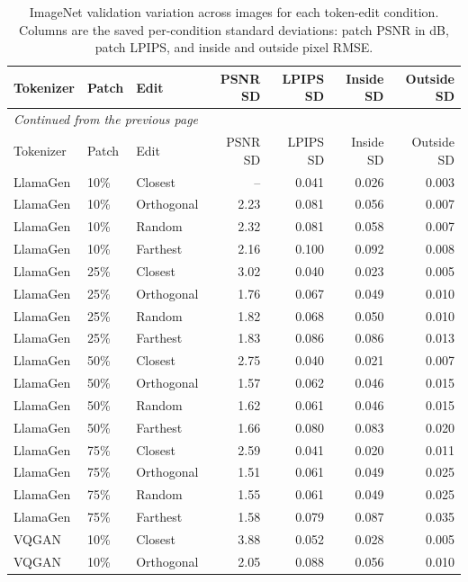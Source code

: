 \begingroup
\small
\setlength{\tabcolsep}{4pt}
\begin{longtable}{lllrrrr}
\caption[ImageNet validation variation across images for each token-edit condition]{ImageNet validation variation across images for each token-edit condition. Columns are the saved per-condition standard deviations: patch PSNR in dB, patch LPIPS, and inside and outside pixel RMSE.}\label{tab:app_imagenet_val_variability}\\
\hline
Tokenizer & Patch & Edit & PSNR SD & LPIPS SD & Inside SD & Outside SD \\ \hline
\endfirsthead
\multicolumn{7}{l}{\small\itshape Continued from the previous page}\\
\hline
Tokenizer & Patch & Edit & PSNR SD & LPIPS SD & Inside SD & Outside SD \\ \hline
\endhead
\hline
\endfoot
LlamaGen & 10\% & Closest & -- & 0.041 & 0.026 & 0.003 \\
LlamaGen & 10\% & Orthogonal & 2.23 & 0.081 & 0.056 & 0.007 \\
LlamaGen & 10\% & Random & 2.32 & 0.081 & 0.058 & 0.007 \\
LlamaGen & 10\% & Farthest & 2.16 & 0.100 & 0.092 & 0.008 \\
LlamaGen & 25\% & Closest & 3.02 & 0.040 & 0.023 & 0.005 \\
LlamaGen & 25\% & Orthogonal & 1.76 & 0.067 & 0.049 & 0.010 \\
LlamaGen & 25\% & Random & 1.82 & 0.068 & 0.050 & 0.010 \\
LlamaGen & 25\% & Farthest & 1.83 & 0.086 & 0.086 & 0.013 \\
LlamaGen & 50\% & Closest & 2.75 & 0.040 & 0.021 & 0.007 \\
LlamaGen & 50\% & Orthogonal & 1.57 & 0.062 & 0.046 & 0.015 \\
LlamaGen & 50\% & Random & 1.62 & 0.061 & 0.046 & 0.015 \\
LlamaGen & 50\% & Farthest & 1.66 & 0.080 & 0.083 & 0.020 \\
LlamaGen & 75\% & Closest & 2.59 & 0.041 & 0.020 & 0.011 \\
LlamaGen & 75\% & Orthogonal & 1.51 & 0.061 & 0.049 & 0.025 \\
LlamaGen & 75\% & Random & 1.55 & 0.061 & 0.049 & 0.025 \\
LlamaGen & 75\% & Farthest & 1.58 & 0.079 & 0.087 & 0.035 \\
VQGAN & 10\% & Closest & 3.88 & 0.052 & 0.028 & 0.005 \\
VQGAN & 10\% & Orthogonal & 2.05 & 0.088 & 0.056 & 0.010 \\

\end{longtable}
